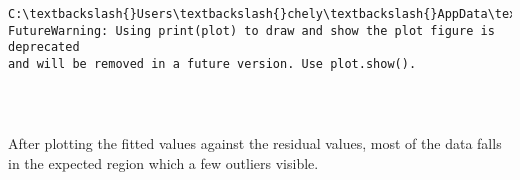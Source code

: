 \documentclass[11pt]{article}
\begin{document}
    \begin{Verbatim}[commandchars=\\\{\}]
C:\textbackslash{}Users\textbackslash{}chely\textbackslash{}AppData\textbackslash{}Local\textbackslash{}Temp\textbackslash{}ipykernel\_20580\textbackslash{}3866888096.py:15:
FutureWarning: Using print(plot) to draw and show the plot figure is deprecated
and will be removed in a future version. Use plot.show().
    \end{Verbatim}

    \begin{center}
    \end{center}
    { \hspace*{\fill} \\}
    
    \begin{Verbatim}[commandchars=\\\{\}]

    \end{Verbatim}

    After plotting the fitted values against the residual values, most of
the data falls in the expected region which a few outliers visible.
\end{document}
